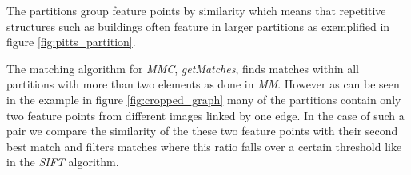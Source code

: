 \documentclass[conference]{IEEEtran}
\begin{document}
The partitions group feature points by similarity which means that 
repetitive structures such as buildings often feature in larger 
partitions as exemplified in figure \ref{fig:pitts_partition}.
%
%		
%

The matching algorithm for \emph{MMC}, \emph{getMatches}, finds matches 
within all partitions with more than two elements as done in \emph{MM}.  
However as can be seen in the example in figure \ref{fig:cropped_graph} 
many of the partitions contain only two feature points from different 
images linked by one edge. In the case of such a pair we compare the 
similarity of the these two feature points with their second best match 
and filters matches where this ratio falls over a certain threshold like 
in the \emph{SIFT} algorithm.
\end{document}
